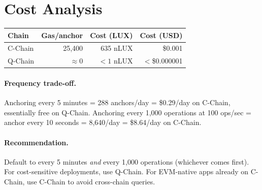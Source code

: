 \section{Cost Analysis}

\label{sec:cost}

\begin{center}
\begin{tabular}{lrrr}
\toprule
\textbf{Chain} & \textbf{Gas/anchor} & \textbf{Cost (LUX)} & \textbf{Cost (USD)} \\
\midrule
C-Chain & 25,400 & 635 nLUX & \$0.001 \\
Q-Chain & $\approx 0$ & $<1$ nLUX & $<$\$0.000001 \\
\bottomrule
\end{tabular}
\end{center}

\paragraph{Frequency trade-off.}
Anchoring every 5 minutes = 288 anchors/day = \$0.29/day on C-Chain,
essentially free on Q-Chain. Anchoring every 1,000 operations at 100
ops/sec = anchor every 10 seconds = 8,640/day = \$8.64/day on C-Chain.

\paragraph{Recommendation.}
Default to every 5 minutes \emph{and} every 1,000 operations (whichever
comes first). For cost-sensitive deployments, use Q-Chain. For EVM-native
apps already on C-Chain, use C-Chain to avoid cross-chain queries.

